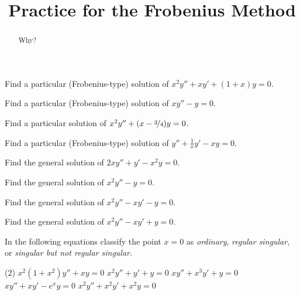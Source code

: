 \documentclass{ximera}
\title{Practice for the Frobenius Method}
\begin{document}
\begin{abstract}
Why?
\end{abstract}
\maketitle


\begin{exercise}
    Find a particular (Frobenius-type) solution of $x^2 y'' + x y' + (1+x) y = 0$.
\end{exercise}

\begin{exercise}
    Find a particular (Frobenius-type) solution of $x y'' - y = 0$.
\end{exercise}

\begin{exercise}%
    Find a particular solution of $x^2 y'' +(x-\nicefrac{3}{4})y = 0$.
\end{exercise}

\begin{exercise}
    Find a particular (Frobenius-type) solution of $y'' +\frac{1}{x}y' - xy = 0$.
\end{exercise}

\begin{exercise}
    Find the general solution of $2 x y'' + y' - x^2 y = 0$.
\end{exercise}

\begin{exercise}%
    Find the general solution of $x^2 y'' -y = 0$.
\end{exercise}

\begin{exercise}
    Find the general solution of $x^2 y'' - x y' -y = 0$.
\end{exercise}

\begin{exercise}[tricky]%
    Find the general solution of $x^2 y'' - x y' +y = 0$.
\end{exercise}

\begin{exercise}
    In the following equations classify the point $x=0$ as \emph{ordinary}, \emph{regular singular}, or \emph{singular but not regular singular}.
    \begin{tasks}(2)
        \task $x^2(1+x^2)y''+xy=0$
        \task $x^2y''+y'+y=0$
        \task $xy''+x^3y'+y=0$
        \task $xy''+xy'-e^xy=0$
        \task $x^2y''+x^2y'+x^2y=0$
    \end{tasks}
\end{exercise}
\end{document}
